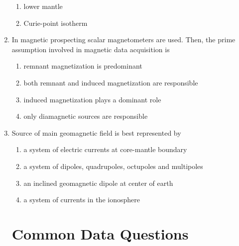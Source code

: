 \documentclass[journal,12pt,onecolumn,fleqn]{IEEEtran}
\theoremstyle{remark}
\theoremstyle{remark}
\begin{document}
\begin{enumerate}[label=Q.\arabic*.,font=\bfseries, start = 21]
\begin{enumerate}
                \item lower mantle
                \item Curie-point isotherm                
            \end{enumerate}
    \item In magnetic prospecting scalar magnetometers are used. Then, the prime assumption involved in magnetic data acquisition is \hfill{} 
            \begin{enumerate}
                \item remnant magnetization is predominant
                \item both remnant and induced magnetization are responsible
                \item induced magnetization plays a dominant role
                \item only diamagnetic sources are responsible                 
            \end{enumerate}
    \item Source of main geomagnetic field is best represented by \hfill{} 
            \begin{enumerate}
                \item a system of electric currents at core-mantle boundary
                \item a system of dipoles, quadrupoles, octupoles and multipoles
                \item an inclined geomagnetic dipole at center of earth
                \item a system of currents in the ionosphere                
            \end{enumerate}
    \section*{Common Data Questions}

\end{enumerate}
\end{document}
